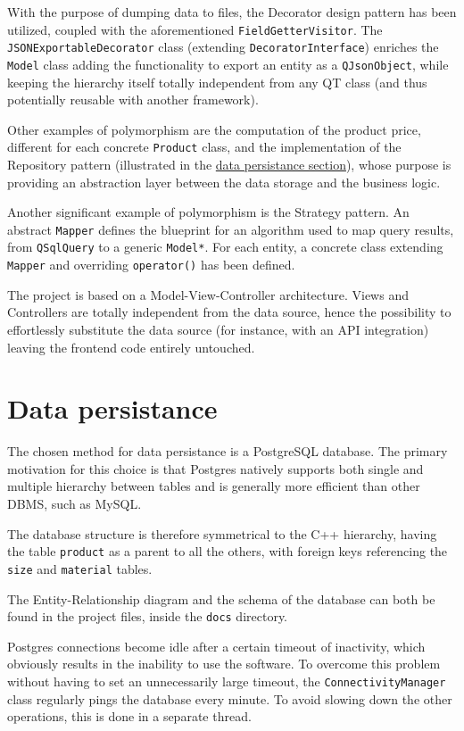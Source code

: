 \documentclass[10pt]{article}
\begin{document}
With the purpose of dumping data to files, the Decorator design pattern has
been utilized, coupled with the aforementioned \texttt{FieldGetterVisitor}. The
\texttt{JSONExportableDecorator} class (extending \texttt{DecoratorInterface})
enriches the \texttt{Model} class adding the functionality to export an entity
as a \texttt{QJsonObject}, while keeping the hierarchy itself totally
independent from any QT class (and thus potentially reusable with another
framework).

Other examples of polymorphism are the computation of the product price,
different for each concrete \texttt{Product} class, and the implementation of
the Repository pattern (illustrated in the \hyperref[sec:dataPersistance]{data
    persistance section}), whose purpose is providing an abstraction layer between
the data storage and the business logic.

Another significant example of polymorphism is the Strategy pattern. An
abstract \texttt{Mapper}\label{txt:Mapper} defines the blueprint for an
algorithm used to map query results, from \texttt{QSqlQuery} to a generic
\texttt{Model*}. For each entity, a concrete class extending \texttt{Mapper}
and overriding \texttt{operator()} has been defined.

The project is based on a Model-View-Controller architecture. Views and
Controllers are totally independent from the data source, hence the possibility
to effortlessly substitute the data source (for instance, with an API
integration) leaving the frontend code entirely untouched.

\section{Data persistance}
\label{sec:dataPersistance}
The chosen method for data persistance is a PostgreSQL database. The primary
motivation for this choice is that Postgres natively supports both single and
multiple hierarchy between tables and is generally more efficient than
other DBMS, such as MySQL.

The database structure is therefore symmetrical to the C++ hierarchy, having
the table \texttt{product} as a parent to all the others, with foreign keys
referencing the \texttt{size} and \texttt{material} tables.

The Entity-Relationship diagram and the schema of the database can both be
found in the project files, inside the \texttt{docs} directory.

Postgres connections become idle after a certain timeout of inactivity, which
obviously results in the inability to use the software. To overcome this
problem without having to set an unnecessarily large timeout, the
\texttt{ConnectivityManager} class regularly pings the database every minute.
To avoid slowing down the other operations, this is done in a separate thread.
\end{document}
